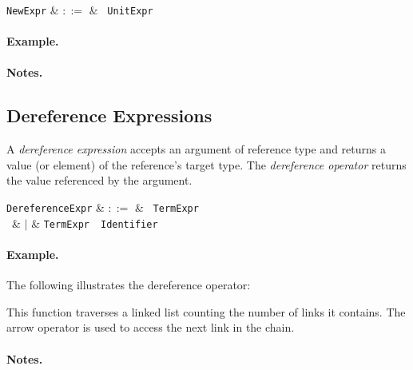 \begin{syntax}
\verb+NewExpr+ & $::=$ & \ \verb+UnitExpr+\\
\end{syntax}

\paragraph{Example.}

\paragraph{Notes.}


\subsection{Dereference Expressions}
\label{c_expr_dereference}

A {\em dereference expression} accepts an argument of reference type and returns a value (or element) of the reference's target type.  The {\em dereference operator} returns the value referenced by the argument.  

\begin{syntax}
  \verb+DereferenceExpr+ & $::=$ & \token{*}\ \verb+TermExpr+\\\
  & $|$ & \verb+TermExpr+\ \token{->}\ \verb+Identifier+\\
\end{syntax}

\paragraph{Example.} The following illustrates the dereference operator:



This function traverses a linked list counting the number of links it contains.  The arrow operator is used to access the next link in the chain.

\paragraph{Notes.}


